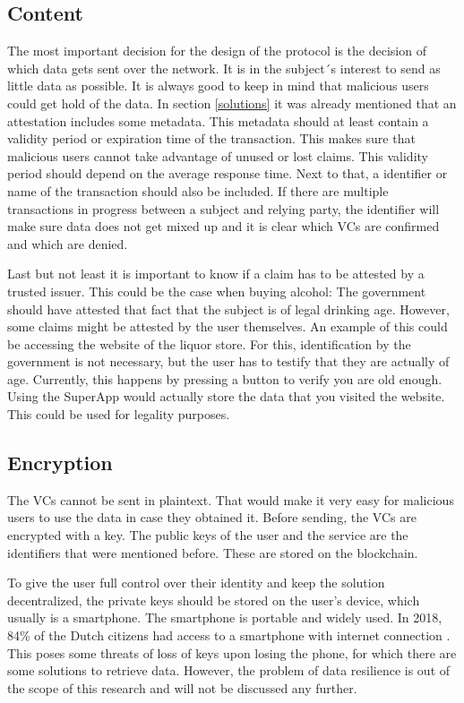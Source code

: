 \subsection{Content}
The most important decision for the design of the protocol is the decision of which data gets sent over the network. It is in the subject´s interest to send as little data as possible. It is always good to keep in mind that malicious users could get hold of the data. 
In section \ref{solutions} it was already mentioned that an attestation includes some metadata. This metadata should at least contain a validity period or expiration time of the transaction. This makes sure that malicious users cannot take advantage of unused or lost claims. This validity period should depend on the average response time. Next to that, a identifier or name of the transaction should also be included. If there are multiple transactions in progress between a subject and relying party, the identifier will make sure data does not get mixed up and it is clear which VCs are confirmed and which are denied. 

Last but not least it is important to know if a claim has to be attested by a trusted issuer. This could be the case when buying alcohol: The government should have attested that fact that the subject is of legal drinking age. However, some claims might be attested by the user themselves. An example of this could be accessing the website of the liquor store. For this, identification by the government is not necessary, but the user has to testify that they are actually of age. Currently, this happens by pressing a button to verify you are old enough. Using the SuperApp would actually store the data that you visited the website. This could be used for legality purposes. 

\subsection{Encryption}
The VCs cannot be sent in plaintext. That would make it very easy for malicious users to use the data in case they obtained it. Before sending, the VCs are encrypted with a key. The public keys of the user and the service are the identifiers that were mentioned before. These are stored on the blockchain. 

To give the user full control over their identity and keep the solution decentralized, the private keys should be stored on the user's device, which usually is a smartphone. The smartphone is portable and widely used. In 2018, 84\% of the Dutch citizens had access to a smartphone with internet connection \cite{eurostat}. This poses some threats of loss of keys upon losing the phone, for which there are some solutions to retrieve data. However, the problem of data resilience is out of the scope of this research and will not be discussed any further.

